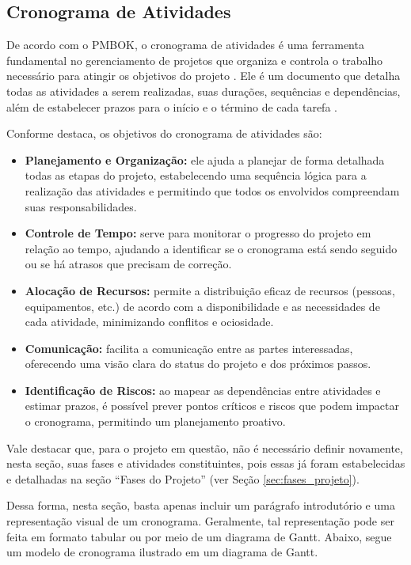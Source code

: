 \subsection{Cronograma de Atividades}\label{sec:cronograma}

De acordo com o PMBOK, o cronograma de atividades é uma ferramenta fundamental no gerenciamento de projetos que organiza e controla o trabalho necessário para atingir os objetivos do projeto \cite{Anunciacao2020,Ramos2020}. Ele é um documento que detalha todas as atividades a serem realizadas, suas durações, sequências e dependências, além de estabelecer prazos para o início e o término de cada tarefa \cite{PMBOK2021}.

Conforme  destaca, os objetivos do cronograma de atividades são:
\begin{itemize}[itemsep=0pt, leftmargin=2.5cm]
    \item \textbf{Planejamento e Organização:} ele ajuda a planejar de forma detalhada todas as etapas do projeto, estabelecendo uma sequência lógica para a realização das atividades e permitindo que todos os envolvidos compreendam suas responsabilidades.
    \item \textbf{Controle de Tempo:} serve para monitorar o progresso do projeto em relação ao tempo, ajudando a identificar se o cronograma está sendo seguido ou se há atrasos que precisam de correção.
    \item \textbf{Alocação de Recursos:} permite a distribuição eficaz de recursos (pessoas, equipamentos, etc.) de acordo com a disponibilidade e as necessidades de cada atividade, minimizando conflitos e ociosidade.
    \item \textbf{Comunicação:} facilita a comunicação entre as partes interessadas, oferecendo uma visão clara do status do projeto e dos próximos passos.
    \item \textbf{Identificação de Riscos:} ao mapear as dependências entre atividades e estimar prazos, é possível prever pontos críticos e riscos que podem impactar o cronograma, permitindo um planejamento proativo.
\end{itemize}

Vale destacar que, para o projeto em questão, não é necessário definir novamente, nesta seção, suas fases e atividades constituintes, pois essas já foram estabelecidas e detalhadas na seção ``Fases do Projeto'' (ver Seção \ref{sec:fases_projeto}).

Dessa forma, nesta seção, basta apenas incluir um parágrafo introdutório e uma re\-presentação visual de um cronograma. Geralmente, tal representação pode ser feita em formato tabular ou por meio de um diagrama de Gantt. Abaixo, segue um modelo de cronograma ilustrado em um diagrama de Gantt.

